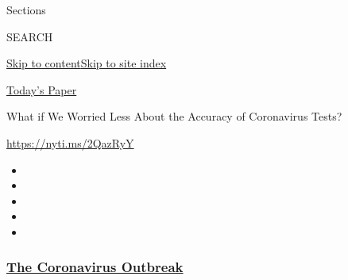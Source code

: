Sections

SEARCH

\protect\hyperlink{site-content}{Skip to
content}\protect\hyperlink{site-index}{Skip to site index}

\href{https://myaccount.nytimes3xbfgragh.onion/auth/login?response_type=cookie\&client_id=vi}{}

\href{https://www.nytimes3xbfgragh.onion/section/todayspaper}{Today's
Paper}

What if We Worried Less About the Accuracy of Coronavirus Tests?

\url{https://nyti.ms/2QazRyY}

\begin{itemize}
\item
\item
\item
\item
\item
\end{itemize}

\hypertarget{the-coronavirus-outbreak}{%
\subsubsection{\texorpdfstring{\href{https://www.nytimes3xbfgragh.onion/news-event/coronavirus?name=styln-coronavirus-national\&region=TOP_BANNER\&block=storyline_menu_recirc\&action=click\&pgtype=Article\&impression_id=8eb19b30-f1cf-11ea-b346-6f5f5ea5e57a\&variant=undefined}{The
Coronavirus
Outbreak}}{The Coronavirus Outbreak}}\label{the-coronavirus-outbreak}}

